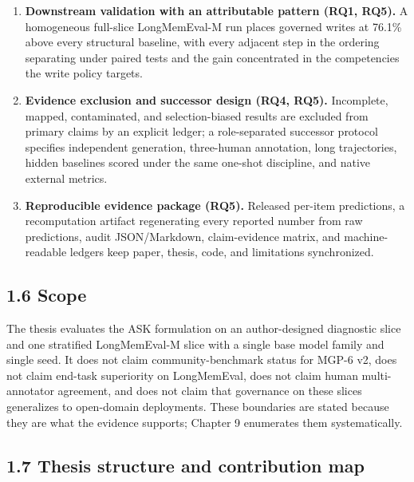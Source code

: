 \begin{enumerate}
  \textbf{Measured negative results (RQ4).} The v2
  pilot\textquotesingle s conflict-type shortcut reaches 1.000 held-out
  accuracy; the v2 reference policy does not outperform the structured
  LLM and its preferred status flips with the cost matrix; and the v4.3
  controller\textquotesingle s abstentions are not selectively
  risk-targeted. Each is reported rather than omitted.
\item
  \textbf{Downstream validation with an attributable pattern (RQ1,
  RQ5).} A homogeneous full-slice LongMemEval-M run places governed
  writes at 76.1\% above every structural baseline, with every adjacent
  step in the ordering separating under paired tests and the gain
  concentrated in the competencies the write policy targets.
\item
  \textbf{Evidence exclusion and successor design (RQ4, RQ5).}
  Incomplete, mapped, contaminated, and selection-biased results are
  excluded from primary claims by an explicit ledger; a role-separated
  successor protocol specifies independent generation, three-human
  annotation, long trajectories, hidden baselines scored under the same
  one-shot discipline, and native external metrics.
\item
  \textbf{Reproducible evidence package (RQ5).} Released per-item
  predictions, a recomputation artifact regenerating every reported
  number from raw predictions, audit JSON/Markdown, claim-evidence
  matrix, and machine-readable ledgers keep paper, thesis, code, and
  limitations synchronized.
\end{enumerate}

\subsection{1.6 Scope}\label{scope}

The thesis evaluates the ASK formulation on an author-designed
diagnostic slice and one stratified LongMemEval-M slice with a single
base model family and single seed. It does not claim community-benchmark
status for MGP-6 v2, does not claim end-task superiority on LongMemEval,
does not claim human multi-annotator agreement, and does not claim that
governance on these slices generalizes to open-domain deployments. These
boundaries are stated because they are what the evidence supports;
Chapter 9 enumerates them systematically.

\subsection{1.7 Thesis structure and contribution
map}\label{thesis-structure-and-contribution-map}

